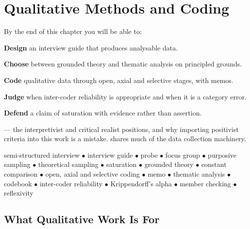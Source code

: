 \chapter{Qualitative Methods and Coding}\label{ch:qualitative}

\begin{outcomes}
By the end of this chapter you will be able to:
\begin{tight}
  \item \textbf{Design} an interview guide that produces analysable data.
  \item \textbf{Choose} between grounded theory and thematic analysis on
    principled grounds.
  \item \textbf{Code} qualitative data through open, axial and selective
    stages, with memos.
  \item \textbf{Judge} when inter-coder reliability is appropriate and when it
    is a category error.
  \item \textbf{Defend} a claim of saturation with evidence rather than
    assertion.
\end{tight}
\end{outcomes}

\begin{prereq}
 --- the interpretivist and critical realist positions, and
why importing positivist criteria into this work is a mistake.
 shares much of the data collection machinery.
\end{prereq}

\begin{keyterms}
semi-structured interview $\bullet$ interview guide $\bullet$ probe $\bullet$
focus group $\bullet$ purposive sampling $\bullet$ theoretical sampling
$\bullet$ saturation $\bullet$ grounded theory $\bullet$ constant comparison
$\bullet$ open, axial and selective coding $\bullet$ memo $\bullet$ thematic
analysis $\bullet$ codebook $\bullet$ inter-coder reliability $\bullet$
Krippendorff's alpha $\bullet$ member checking $\bullet$ reflexivity
\end{keyterms}

\section{What Qualitative Work Is For}


